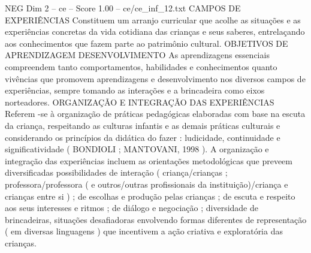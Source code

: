 \begin{textsample}{NEG Dim 2 – ce – Score 1.00 – ce/ce\_inf\_12.txt}
CAMPOS DE EXPERIÊNCIAS Constituem um arranjo curricular que acolhe as situações e as experiências concretas da vida cotidiana das crianças e seus saberes, entrelaçando aos conhecimentos que fazem parte ao patrimônio cultural.
OBJETIVOS DE APRENDIZAGEM DESENVOLVIMENTO As aprendizagens essenciais compreendem tanto comportamentos, habilidades e conhecimentos quanto vivências que promovem aprendizagens e desenvolvimento nos diversos campos de experiências, sempre tomando as interações e a brincadeira como eixos norteadores.
ORGANIZAÇÃO E INTEGRAÇÃO DAS EXPERIÊNCIAS Referem -se à organização de práticas pedagógicas elaboradas com base na escuta da criança, respeitando as culturas infantis e as demais práticas culturais e considerando os princípios da didática do fazer : ludicidade, continuidade e significatividade ( BONDIOLI ; MANTOVANI, 1998 ).
A organização e integração das experiências incluem as orientações metodológicas que preveem diversificadas possibilidades de interação ( criança/crianças ; professora/professora ( e outros/outras profissionais da instituição)/criança e crianças entre si ) ; de escolhas e produção pelas crianças ; de escuta e respeito aos seus interesses e ritmos ; de diálogo e negociação ; diversidade de brincadeiras, situações desafiadoras envolvendo formas diferentes de representação ( em diversas linguagens ) que incentivem a ação criativa e exploratória das crianças.

\end{textsample}
